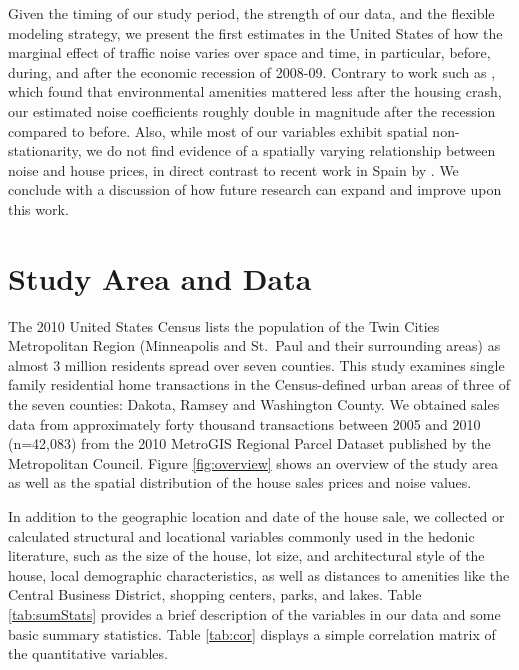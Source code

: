 \documentclass{article}\usepackage{graphicx, color}
\begin{document}
Given the timing of our study period, the strength of our data, and the flexible modeling strategy, we present the first estimates in the United States of how the marginal effect of traffic noise varies over space and time, in particular, before, during, and after the  economic recession of 2008-09. Contrary to work such as \citet{Cho2011b}, which found that environmental amenities mattered less after the housing crash, our estimated noise coefficients roughly double in magnitude after the recession compared to before. Also, while most of our variables exhibit spatial non-stationarity, we do not find evidence of a spatially varying relationship between noise and house prices, in direct contrast to recent work in Spain by \citet{MarmolejoDuarteCarlos;GonzalezTamez2009}. We conclude with a discussion of how future research can expand and improve upon this work.

\section{Study Area and Data}
The 2010 United States Census lists the population of the Twin Cities Metropolitan Region (Minneapolis and St.\ Paul and their surrounding areas) as almost 3 million residents spread over seven counties. This study examines single family residential home transactions in the Census-defined urban areas of three of the seven counties: Dakota, Ramsey and Washington County. We obtained sales data from approximately forty thousand transactions between 2005 and 2010 (n=42,083) from the 2010 MetroGIS Regional Parcel Dataset published by the Metropolitan Council. Figure \ref{fig:overview} shows an overview of the study area as well as the spatial distribution of the house sales prices and noise values. 

In addition to the geographic location and date of the house sale, we collected or calculated structural and locational variables commonly used in the hedonic literature, such as the size of the house, lot size, and architectural style of the house, local demographic characteristics, as well as distances to amenities like the Central Business District, shopping centers, parks, and lakes. Table \ref{tab:sumStats} provides a brief description of the variables in our data and some basic summary statistics. Table \ref{tab:cor} displays a simple correlation matrix of the quantitative variables.
\end{document}

